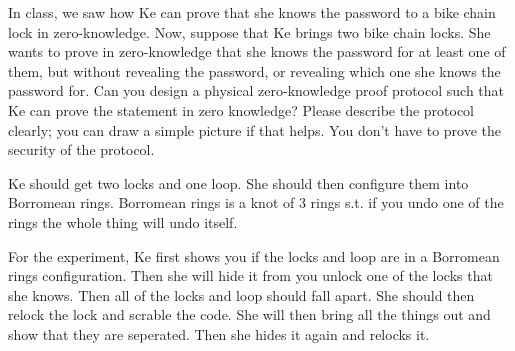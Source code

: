 \documentclass[12pt, letterpaper]{article}
\begin{document}
\color{\TextColor}
\pagecolor{\colormode}
\setlength{\parindent}{0pt}
\pagestyle{fancy}
\fancyhf{}

\begin{problem}{}
    In class, we saw how 
Ke can prove that she knows the password to a bike chain lock in zero-knowledge.
Now, suppose that Ke brings two bike chain locks. She wants to prove
in zero-knowledge 
that she knows the password for at least one of them, but without
revealing the password, or revealing which one she knows the password for.
Can you design a physical zero-knowledge proof protocol
such that Ke can prove the statement in zero knowledge?
Please describe the protocol clearly; you can draw a simple picture if that helps. 
You don't have to prove the security of the protocol.
\end{problem}
\begin{problemproof}
    Ke should get two locks and one loop. She should then configure them into Borromean rings.
    Borromean rings is a knot of 3 rings s.t. if you undo one of the rings the whole thing will undo itself.

    For the experiment, Ke first shows you if the locks and loop are in a Borromean rings configuration. 
    Then she will hide it from you unlock one of the locks that she knows.
    Then all of the locks and loop should fall apart. She should then relock the lock and scrable the code.
    She will then bring all the things out and show that they are seperated.
    Then she hides it again and relocks it.
\end{problemproof}
\end{document}
